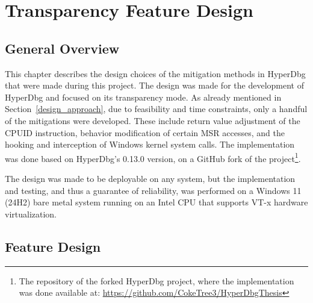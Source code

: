 \section{Transparency Feature Design}\label{s:design}

\subsection{General Overview}
This chapter describes the design choices of the mitigation methods in HyperDbg that were made during this project. The design was made for the development of HyperDbg and focused on its transparency mode. 
As already mentioned in Section~\ref{design_approach}, due to feasibility and time constraints, only a handful of the mitigations were developed. 
These include return value adjustment of the CPUID instruction, behavior modification of certain MSR accesses, and the hooking and interception of Windows kernel system calls. 
The implementation was done based on HyperDbg's 0.13.0 version, on a GitHub fork of the project\footnote{The repository of the forked HyperDbg project, where the implementation was done available at: \url{https://github.com/CokeTree3/HyperDbgThesis}}.

The design was made to be deployable on any system, but the implementation and testing, and thus a guarantee of reliability, 
was performed on a Windows 11 (24H2) bare metal system running on an Intel CPU that supports VT-x hardware virtualization. 


\subsection{Feature Design}
